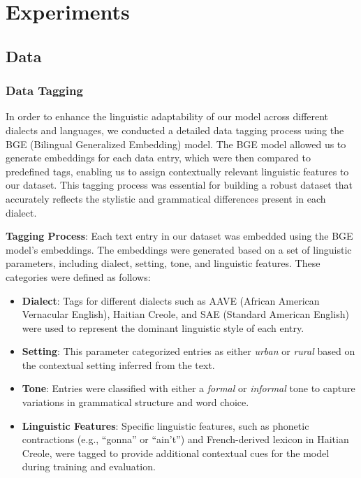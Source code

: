 \section{Experiments}
\label{sec:experiments}

\subsection{Data}

\subsubsection{Data Tagging}

In order to enhance the linguistic adaptability of our model across different dialects and languages, we conducted a detailed data tagging process using the BGE (Bilingual Generalized Embedding) model. The BGE model allowed us to generate embeddings for each data entry, which were then compared to predefined tags, enabling us to assign contextually relevant linguistic features to our dataset. This tagging process was essential for building a robust dataset that accurately reflects the stylistic and grammatical differences present in each dialect.

\textbf{Tagging Process}: Each text entry in our dataset was embedded using the BGE model's embeddings. The embeddings were generated based on a set of linguistic parameters, including dialect, setting, tone, and linguistic features. These categories were defined as follows:
\begin{itemize}
    \item \textbf{Dialect}: Tags for different dialects such as AAVE (African American Vernacular English), Haitian Creole, and SAE (Standard American English) were used to represent the dominant linguistic style of each entry.
    \item \textbf{Setting}: This parameter categorized entries as either \textit{urban} or \textit{rural} based on the contextual setting inferred from the text.
    \item \textbf{Tone}: Entries were classified with either a \textit{formal} or \textit{informal} tone to capture variations in grammatical structure and word choice.
    \item \textbf{Linguistic Features}: Specific linguistic features, such as phonetic contractions (e.g., “gonna” or “ain’t”) and French-derived lexicon in Haitian Creole, were tagged to provide additional contextual cues for the model during training and evaluation.
\end{itemize}


